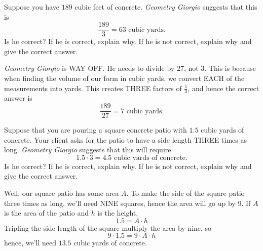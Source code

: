 \documentclass[handout,nooutcomes,noauthor]{ximera}
\begin{document}
\begin{question}
  Suppose you have $189$ cubic feet of concrete. \textit{Geometry
    Giorgio} suggests that this is
  \[
  \frac{189}{3} = 63 \text{ cubic yards}.
  \]
  Is he correct? If he is correct, explain why. If he is not correct,
  explain why and give the correct answer.
  \begin{freeResponse}
     \textit{Geometry Giorgio} is WAY OFF. He needs to divide by $27$,
     not $3$. This is because when finding the volume of our form in
     cubic yards, we convert EACH of the measurements into yards. This
     creates THREE factors of $\frac{1}{3}$, and hence the correct
     answer is
     \[
     \frac{189}{27} = 7 \text{ cubic yards}.
     \]
  \end{freeResponse}
\end{question}
\mynewpage


\begin{question}
  Suppose that you are pouring a square concrete patio with $1.5$
  cubic yards of concrete. Your client asks for the patio to have a
  side length THREE times as long.  \textit{Geometry Giorgio} suggests
  that this will require
  \[
  1.5\cdot  3 = 4.5 \text{ cubic yards of concrete}.
  \]
  Is he correct? If he is correct, explain why. If he is not correct,
  explain why and give the correct answer.
  \begin{freeResponse}
    Well, our square patio has some area $A$. To make the side of the
    square patio three times as long, we'll need NINE squares, hence
    the area will go up by $9$. If $A$ is the area of the patio and
    $h$ is the height,
    \[
    1.5 = A \cdot h
    \]
    Tripling the side length of the square multiply the area by nine, so
    \[
    9\cdot 1.5 = 9\cdot A \cdot h 
    \]
    hence, we'll need $13.5$ cubic yards of concrete.
  \end{freeResponse}
\end{question}
\end{document}

